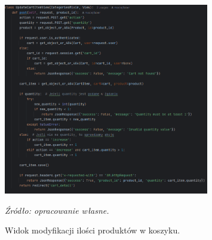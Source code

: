 \documentclass[12pt,a4paper,oneside]{article}
\theoremstyle{definition}
\numberwithin{equation}{section}
\begin{document}
\begin{figure}[H]
    \centering
    \includegraphics[width=0.8\textwidth]{images/krzysztofBImages/update_cart_item_view.png}
    \caption{Widok modyfikacji ilości produktów w koszyku.}
    \emph{Źródło: opracowanie własne.}
    \label{fig:update_cart}
\end{figure}
%
%
\end{document}
